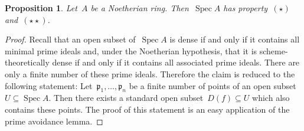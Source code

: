 \documentclass[10pt]{amsart}
\theoremstyle{definition}
\theoremstyle{plain}
\newtheorem{prop}[defn]{Proposition}
\theoremstyle{remark}
\newcommand{\ppp}{\mathfrak{p}}
\DeclareMathOperator{\Spec}{Spec}
\newcommand{\?}{\,{:}\,}
\renewcommand{\_}{\mathpunct{.}\,}
\begin{document}
\begin{prop}Let~$A$ be a Noetherian ring. Then~$\Spec A$ has property~$(\star)$
and~$(\star\star)$.
\end{prop}
\begin{proof}Recall that an open subset of~$\Spec A$ is dense if and only if it
contains all minimal prime ideals and, under the Noetherian hypothesis, that it
is scheme-theoretically dense if and only if it contains all associated prime
ideals. There are only a finite number of these prime ideals. Therefore the
claim is reduced to the following statement: Let~$\ppp_1,\ldots,\ppp_n$ be a
finite number of points of an open subset~$U \subseteq \Spec A$. Then there
exists a standard open subset~$D(f) \subseteq U$ which also contains these
points. The proof of this statement is an easy application of the prime
avoidance lemma.
\end{proof}
\end{document}
